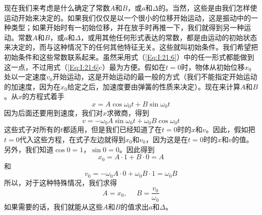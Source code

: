 现在我们来考虑是什么确定了常数$A$和$B$，或$a$和$\Delta$的。当然，这些是由我们怎样使运动开始来决定的。如果我们仅仅是以一个很小的位移开始运动，这是振动中的一种类型；如果开始时有一初始位移，并在放手时再推一下，我们就得到另一种运动。常数$A$和$B$，或$a$和$\Delta$，或用其他任何形式表达的常数，都是由运动的初始状态来决定的，而与这种情况下的任何其他特征无关。这些就叫初始条件。我们希望把初始条件和这些常数联系起来。虽然采用式（\ref{Eq:I:21:6}）中的任一形式都能做到这一点，不过用式（\ref{Eq:I:21:6}c）最为方便。假如在$t=0$时，物体从初始位移$x_0$处以一定速度$v_0$开始运动，这是开始运动的最一般的方式（我们不能指定开始运动的加速度，因为在$x_0$给定之后，加速度要由弹簧的性质来决定）。现在来计算$A$和$B$。从$x$的方程式着手
\begin{equation*}
    x=A\cos\omega_0t+B\sin\omega_0t
\end{equation*}
因为后面还要用到速度，我们对$x$求微商，得到
\begin{equation*}
    v=-\omega_0A\sin\omega_0t+\omega_0B\cos\omega_0t
\end{equation*}
这些式子对所有的$t$都适用，但是我们已经知道了在$t=0$时的$x$和$v$。因此，假如把$t=0$代入这些方程，在式子左边就得到$x_0$和$v_0$，因为这是在$t=0$时的$x$和$v$的值。另外，我们知道$\cos 0=1$，$\sin 0=0$。因此得到
\begin{equation*}
    x_0 = A \cdot 1 + B \cdot 0 = A
\end{equation*}
和
\begin{equation*}
    v_0=-\omega_0A \cdot 0+\omega_0B \cdot 1 = \omega_0 B
\end{equation*}
所以，对于这种特殊情况，我们求得
\begin{equation*}
    A=x_0,~~~~~~B=\frac{v_0}{\omega_0}
\end{equation*}
如果需要的话，我们就能从这些$A$和$B$的值求出$a$和$\Delta$。

